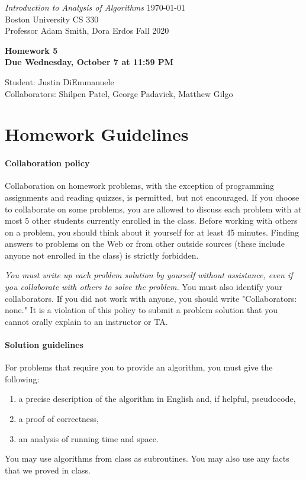 \documentclass[letterpaper,11pt]{article}
\begin{document}
{\noindent\large
{\em Introduction to Analysis of Algorithms} \hfill \today\\
Boston University \hfill CS 330\\
Professor  Adam Smith, Dora Erdos \hfill Fall 2020\\}


\vspace{1pt}
\hrulefill\vspace{3mm}
\begin{center}
{\LARGE\bf Homework 5}\\
{\bf Due Wednesday, October 7 at 11:59 PM}
\end{center}
\begin{center}
    \color{teal}
   Student: Justin DiEmmanuele \\
    Collaborators: Shilpen Patel, George Padavick, Matthew Gilgo
\end{center}



\section*{Homework Guidelines}

\paragraph{Collaboration policy} Collaboration on homework problems, with the exception of
programming assignments and reading quizzes, is permitted, but not encouraged.
If you
choose to collaborate on some problems, you are allowed to discuss
each problem with at most 5 other students currently enrolled in the
class.
Before working with others on a problem, you should think about it
yourself for at least 45 minutes. Finding answers to problems on the
Web or from other outside sources (these include anyone not enrolled
in the class) is strictly forbidden.

{\em You must write up each problem solution by yourself without
assistance, even if you collaborate with others to solve the
problem.} You must also identify your collaborators. If you did not
work with anyone, you should write "Collaborators: none." It is a
violation of this policy to submit a problem solution that you
cannot orally explain to an instructor or TA.

\paragraph{Solution guidelines} For problems that require you to provide an algorithm, you must give the following:
    \begin{enumerate}
\item  a precise description of the algorithm in English and, if helpful, pseudocode,
\item a proof of correctness,
\item an analysis of running time and space.
\end{enumerate}
You may use algorithms from class as subroutines. You may also use any facts that we proved in class.
\end{document}
